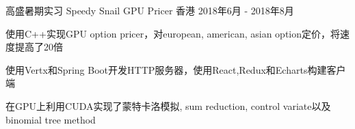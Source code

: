 \cventry
{高盛暑期实习} %
{Speedy Snail GPU Pricer} %
{香港} %
{2018年6月 - 2018年8月} %
{ %
	\begin{cvitems}
		\item {使用C++实现GPU option pricer，对european, american, asian option定价，将速度提高了20倍}
		\item {使用Vertx和Spring Boot开发HTTP服务器，使用React,Redux和Echarts构建客户端}
		\item {在GPU上利用CUDA实现了蒙特卡洛模拟, sum reduction, control variate以及binomial tree method}
	\end{cvitems}
}